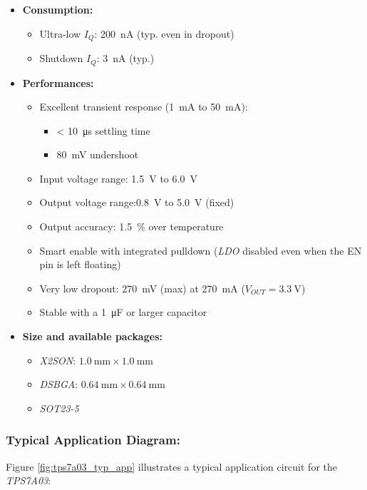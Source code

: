 \documentclass[report.tex]{subfiles}
\begin{document}
\begin{itemize}
\item \textbf{Consumption:}
\begin{itemize}
\item Ultra-low $I_Q$: \SI{200}{\nano\ampere} (typ. even in dropout)
\item Shutdown $I_Q$: \SI{3}{\nano\ampere} (typ.)
\end{itemize}
\item \textbf{Performances:}
\begin{itemize}
\item Excellent transient response (\SI{1}{\milli\ampere} to \SI{50}{\milli\ampere}):
\begin{itemize}[$\circ$]
\item < \SI{10}{\micro\second} settling time
\item \SI{80}{\milli\volt} undershoot
\end{itemize}
\item Input voltage range: \SI{1.5}{\volt} to \SI{6.0}{\volt}
\item Output voltage range:\SI{0.8}{\volt} to \SI{5.0}{\volt} (fixed)
\item Output accuracy: \SI{1.5}{\percent} over temperature
\item Smart enable with integrated pulldown (\textit{LDO} disabled even when the EN pin is left floating)
\item Very low dropout: \SI{270}{\milli\volt} (max) at \SI{270}{\milli\ampere} ($V_{OUT} = \SI{3.3}{\volt}$)
\item Stable with a \SI{1}{\micro\farad} or larger capacitor
\end{itemize}
\item \textbf{Size and available packages:}
\begin{itemize}
\item \textit{X2SON}: $\SI{1.0}{\milli\meter} \times \SI{1.0}{\milli\meter}$
\item \textit{DSBGA}: $\SI{0.64}{\milli\meter} \times \SI{0.64}{\milli\meter}$
\item \textit{SOT23-5}
\end{itemize}
\end{itemize}


\subsubsection{Typical Application Diagram:}

Figure \ref{fig:tps7a03_typ_app} illustrates a typical application circuit for the \textit{TPS7A03}:
\end{document}
